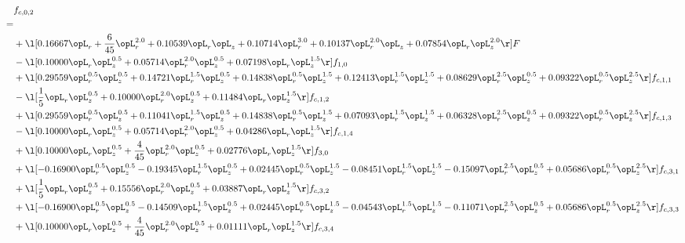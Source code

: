 \begin{alignat}{2} 
\label{eq:f_02_2} 
& f_{c,0,2} \nonumber \\ 
 = \\ 
& + \l[  0.16667 \opL_r + \frac{6}{45} \opL_r^{2.0} +  0.10539 \opL_r \opL_z +  0.10714 \opL_r^{3.0} +  0.10137 \opL_r^{2.0} \opL_z +  0.07854 \opL_r \opL_z^{2.0}  \r] F \nonumber \\ 
& - \l[  0.10000 \opL_r \opL_z^{0.5} +  0.05714 \opL_r^{2.0} \opL_z^{0.5} +  0.07198 \opL_r \opL_z^{1.5}  \r] f_{1,0} \nonumber \\ 
& + \l[  0.29559 \opL_r^{0.5} \opL_z^{0.5} +  0.14721 \opL_r^{1.5} \opL_z^{0.5} +  0.14838 \opL_r^{0.5} \opL_z^{1.5} +  0.12413 \opL_r^{1.5} \opL_z^{1.5} +  0.08629 \opL_r^{2.5} \opL_z^{0.5} +  0.09322 \opL_r^{0.5} \opL_z^{2.5}  \r] f_{c,1,1} \nonumber \\ 
& - \l[ \frac{1}{5} \opL_r \opL_z^{0.5} +  0.10000 \opL_r^{2.0} \opL_z^{0.5} +  0.11484 \opL_r \opL_z^{1.5}  \r] f_{c,1,2} \nonumber \\ 
& + \l[  0.29559 \opL_r^{0.5} \opL_z^{0.5} +  0.11041 \opL_r^{1.5} \opL_z^{0.5} +  0.14838 \opL_r^{0.5} \opL_z^{1.5} +  0.07093 \opL_r^{1.5} \opL_z^{1.5} +  0.06328 \opL_r^{2.5} \opL_z^{0.5} +  0.09322 \opL_r^{0.5} \opL_z^{2.5}  \r] f_{c,1,3} \nonumber \\ 
& - \l[  0.10000 \opL_r \opL_z^{0.5} +  0.05714 \opL_r^{2.0} \opL_z^{0.5} +  0.04286 \opL_r \opL_z^{1.5}  \r] f_{c,1,4} \nonumber \\ 
& + \l[  0.10000 \opL_r \opL_z^{0.5} + \frac{4}{45} \opL_r^{2.0} \opL_z^{0.5} +  0.02776 \opL_r \opL_z^{1.5}  \r] f_{3,0} \nonumber \\ 
& + \l[  -0.16900 \opL_r^{0.5} \opL_z^{0.5}   -0.19345 \opL_r^{1.5} \opL_z^{0.5} +  0.02445 \opL_r^{0.5} \opL_z^{1.5}   -0.08451 \opL_r^{1.5} \opL_z^{1.5}   -0.15097 \opL_r^{2.5} \opL_z^{0.5} +  0.05686 \opL_r^{0.5} \opL_z^{2.5}  \r] f_{c,3,1} \nonumber \\ 
& + \l[ \frac{1}{5} \opL_r \opL_z^{0.5} +  0.15556 \opL_r^{2.0} \opL_z^{0.5} +  0.03887 \opL_r \opL_z^{1.5}  \r] f_{c,3,2} \nonumber \\ 
& + \l[  -0.16900 \opL_r^{0.5} \opL_z^{0.5}   -0.14509 \opL_r^{1.5} \opL_z^{0.5} +  0.02445 \opL_r^{0.5} \opL_z^{1.5}   -0.04543 \opL_r^{1.5} \opL_z^{1.5}   -0.11071 \opL_r^{2.5} \opL_z^{0.5} +  0.05686 \opL_r^{0.5} \opL_z^{2.5}  \r] f_{c,3,3} \nonumber \\ 
& + \l[  0.10000 \opL_r \opL_z^{0.5} + \frac{4}{45} \opL_r^{2.0} \opL_z^{0.5} +  0.01111 \opL_r \opL_z^{1.5}  \r] f_{c,3,4} \nonumber \\ 

\end{alignat}

